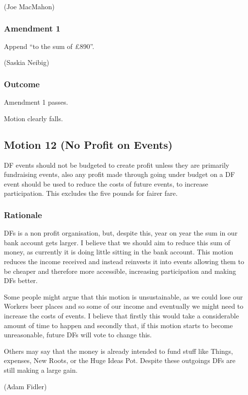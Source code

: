 \documentclass[a4paper, 11pt]{article} %
\begin{document}
(Joe MacMahon)

\subsubsection{Amendment 1}
Append ``to the sum of  £890''.

(Saskia Neibig)

\subsubsection{Outcome}

Amendment 1 passes.

Motion clearly falls.

\subsection{Motion 12 (No Profit on Events)}

DF events should not be budgeted to create profit unless they are primarily fundraising events, also any profit made through going under budget on a DF event should be used to reduce the costs of future events, to increase participation. This excludes the five pounds for fairer fare.

\subsubsection{Rationale}
DFs is a non profit organisation, but, despite this, year on year the sum in our bank account gets larger.  I believe that we should aim to reduce this sum of money, as currently it is doing little sitting in the bank account.  This motion reduces the income received and instead reinvests it into events allowing them to be cheaper and therefore more accessible, increasing participation and making DFs better.

Some people might argue that this motion is unsustainable, as we could lose our Workers beer places and so some of our income and eventually we might need to increase the costs of events.  I believe that firstly this would take a considerable amount of time to happen and secondly that, if this motion starts to become unreasonable, future DFs will vote to change this.

Others may say that the money is already intended to fund stuff like Things, expenses, New Roots, or the Huge Ideas Pot.  Despite these outgoings DFs are still making a large gain.

(Adam Fidler)
\end{document}

